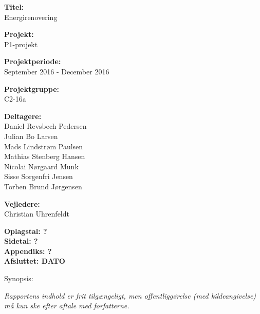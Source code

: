 \begin{minipage}[t]{0.48\textwidth}
\textbf{Titel:} \\[5pt]\bigskip\hspace{2ex}
Energirenovering

\textbf{Projekt:} \\[5pt]\bigskip\hspace{2ex}
P1-projekt

\textbf{Projektperiode:} \\[5pt]\bigskip\hspace{2ex}
September 2016 - December 2016

\textbf{Projektgruppe:} \\[5pt]\bigskip\hspace{2ex}
C2-16a	

\textbf{Deltagere:} \\[5pt]\hspace*{2ex}
Daniel Revsbech Pedersen \\\hspace*{2ex}
Julian Bo Larsen \\\hspace*{2ex}
Mads Lindstrøm Paulsen \\\hspace*{2ex}
Mathias Stenberg Hansen \\\hspace*{2ex}
Nicolai Nørgaard Munk \\\hspace*{2ex}
Sisse Sorgenfri Jensen \\\bigskip\hspace{2ex}
Torben Brund Jørgensen

\textbf{Vejledere:} \\[5pt]\hspace*{2ex}
Christian Uhrenfeldt \\\bigskip\hspace{2ex}


\vspace*{1cm}

\textbf{Oplagstal: ?} \\
\textbf{Sidetal: ?} \\
\textbf{Appendiks: ?} \\ 
\textbf{Afsluttet: DATO}

\end{minipage}
\hfill
\begin{minipage}[t]{0.483\textwidth}
Synopsis: \\[5pt]
\fbox{\parbox{7cm}{\bigskip\bigskip}}
\end{minipage}

\vfill

{\footnotesize\itshape Rapportens indhold er frit tilgængeligt, men offentliggørelse (med kildeangivelse) må kun ske efter aftale med forfatterne.}

